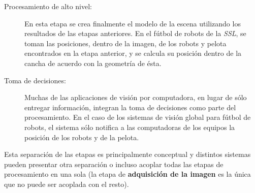 \begin{description}
	\item[Procesamiento de alto nivel:] En esta etapa se crea finalmente el
		modelo de la escena utilizando los resultados de las etapas
		anteriores. En el fútbol de robots de la \emph{SSL}, se toman
		las posiciones, dentro de la imagen, de los robots y pelota
		encontrados en la etapa anterior, y se calcula su posición
		dentro de la cancha de acuerdo con la geometría de ésta.

	\item[Toma de decisiones:] Muchas de las aplicaciones de visión por
		computadora, en lugar de sólo entregar información, integran la
		toma de decisiones como parte del procesamiento. En el caso de
		los sistemas de visión global para fútbol de robots, el sistema
		sólo notifica a las computadoras de los equipos la posición de
		los robots y de la pelota.

\end{description}

Esta separación de las etapas es principalmente conceptual y distintos sistemas
pueden presentar otra separación o incluso acoplar todas las etapas de
procesamiento en una sola (la etapa de \textbf{adquisición de la imagen} es la
única que no puede ser acoplada con el resto).
